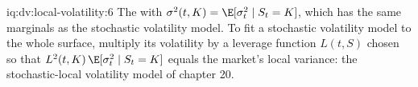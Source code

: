 \begin{solution}{iq:dv:local-volatility:6}
The  with $\sigma^2(t,K)=\E[\sigma_t^2\mid S_t=K]$, which has the same marginals as the
stochastic volatility model. To fit a stochastic volatility model to the whole surface, multiply its volatility by a
leverage function $L(t,S)$ chosen so that $L^2(t,K)\,\E[\sigma_t^2\mid S_t=K]$ equals the market's local variance: the
stochastic-local volatility model of chapter 20.
\end{solution}
